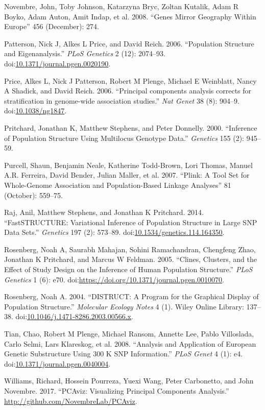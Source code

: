 \documentclass[smallextended]{svjour3}       %
\begin{document}
\hypertarget{ref-Novembre08b}{}
Novembre, John, Toby Johnson, Katarzyna Bryc, Zoltan Kutalik, Adam R
Boyko, Adam Auton, Amit Indap, et al. 2008. ``Genes Mirror Geography
Within Europe'' 456 (December): 274.

\hypertarget{ref-Patterson06}{}
Patterson, Nick J, Alkes L Price, and David Reich. 2006. ``Population
Structure and Eigenanalysis.'' \emph{PLoS Genetics} 2 (12): 2074--93.
doi:\href{https://doi.org/10.1371/journal.pgen.0020190}{10.1371/journal.pgen.0020190}.

\hypertarget{ref-Price06}{}
Price, Alkes L, Nick J Patterson, Robert M Plenge, Michael E Weinblatt,
Nancy A Shadick, and David Reich. 2006. ``Principal components analysis
corrects for stratification in genome-wide association studies.''
\emph{Nat Genet} 38 (8): 904--9.
doi:\href{https://doi.org/10.1038/ng1847}{10.1038/ng1847}.

\hypertarget{ref-Pritchard00}{}
Pritchard, Jonathan K, Matthew Stephens, and Peter Donnelly. 2000.
``Inference of Population Structure Using Multilocus Genotype Data.''
\emph{Genetics} 155 (2): 945--59.

\hypertarget{ref-Purcell07}{}
Purcell, Shaun, Benjamin Neale, Katherine Todd-Brown, Lori Thomas,
Manuel A.R. Ferreira, David Bender, Julian Maller, et al. 2007. ``Plink:
A Tool Set for Whole-Genome Association and Population-Based Linkage
Analyses'' 81 (October): 559--75.

\hypertarget{ref-Raj14}{}
Raj, Anil, Matthew Stephens, and Jonathan K Pritchard. 2014.
``FastSTRUCTURE: Variational Inference of Population Structure in Large
SNP Data Sets.'' \emph{Genetics} 197 (2): 573--89.
doi:\href{https://doi.org/10.1534/genetics.114.164350}{10.1534/genetics.114.164350}.

\hypertarget{ref-Rosenberg05}{}
Rosenberg, Noah A, Saurabh Mahajan, Sohini Ramachandran, Chengfeng Zhao,
Jonathan K Pritchard, and Marcus W Feldman. 2005. ``Clines, Clusters,
and the Effect of Study Design on the Inference of Human Population
Structure.'' \emph{PLoS Genetics} 1 (6): e70.
doi:\href{https://doi.org/https://doi.org/10.1371/journal.pgen.0010070}{https://doi.org/10.1371/journal.pgen.0010070}.

\hypertarget{ref-Rosenberg04}{}
Rosenberg, Noah A. 2004. ``DISTRUCT: A Program for the Graphical Display
of Population Structure.'' \emph{Molecular Ecology Notes} 4 (1). Wiley
Online Library: 137--38.
doi:\href{https://doi.org/10.1046/j.1471-8286.2003.00566.x}{10.1046/j.1471-8286.2003.00566.x}.

\hypertarget{ref-Tian2008aa}{}
Tian, Chao, Robert M Plenge, Michael Ransom, Annette Lee, Pablo
Villoslada, Carlo Selmi, Lars Klareskog, et al. 2008. ``Analysis and
Application of European Genetic Substructure Using 300 K SNP
Information.'' \emph{PLoS Genet} 4 (1): e4.
doi:\href{https://doi.org/10.1371/journal.pgen.0040004}{10.1371/journal.pgen.0040004}.

\hypertarget{ref-Novembre17}{}
Williams, Richard, Hossein Pourreza, Yuexi Wang, Peter Carbonetto, and
John Novembre. 2017. ``PCAviz: Visualizing Principal Components
Analysis.'' \url{http://github.com/NovembreLab/PCAviz}.



\end{document}
